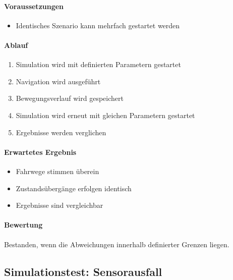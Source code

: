\paragraph{Voraussetzungen}\label{voraussetzungen-19}

\begin{itemize}
\tightlist
\item
  Identisches Szenario kann mehrfach gestartet werden
\end{itemize}

\paragraph{Ablauf}\label{ablauf-19}

\begin{enumerate}
\def\labelenumi{\arabic{enumi}.}
\tightlist
\item
  Simulation wird mit definierten Parametern gestartet
\item
  Navigation wird ausgeführt
\item
  Bewegungsverlauf wird gespeichert
\item
  Simulation wird erneut mit gleichen Parametern gestartet
\item
  Ergebnisse werden verglichen
\end{enumerate}

\paragraph{Erwartetes Ergebnis}\label{erwartetes-ergebnis-19}

\begin{itemize}
\tightlist
\item
  Fahrwege stimmen überein
\item
  Zustandsübergänge erfolgen identisch
\item
  Ergebnisse sind vergleichbar
\end{itemize}

\paragraph{Bewertung}\label{bewertung-19}

Bestanden, wenn die Abweichungen innerhalb definierter Grenzen liegen.

\subsection{Simulationstest:
Sensorausfall}\label{simulationstest-sensorausfall}

